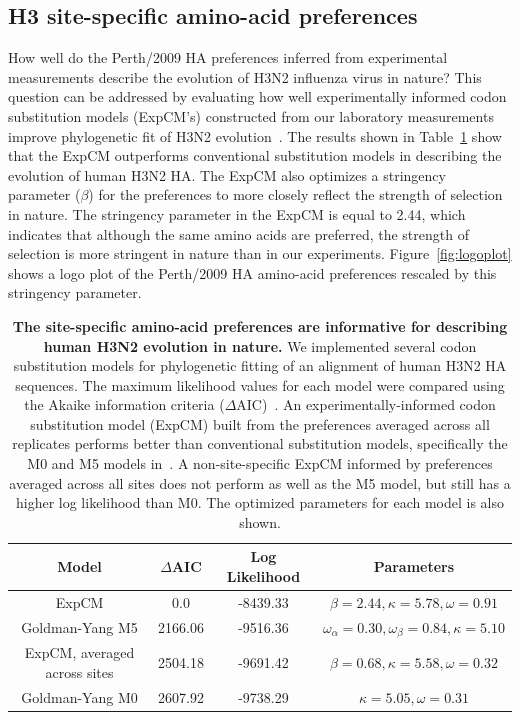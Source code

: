 \documentclass[11pt]{article}
\begin{document}
\subsection*{H3 site-specific amino-acid preferences}
How well do the Perth/2009 HA preferences inferred from experimental measurements describe the evolution of H3N2 influenza virus in nature?
This question can be addressed by evaluating how well experimentally informed codon substitution models (ExpCM's) constructed from our laboratory measurements improve phylogenetic fit of H3N2 evolution~\citep{hilton2017phydms}.
The results shown in Table~\ref{tab:phydms} show that the ExpCM outperforms conventional substitution models in describing the evolution of human H3N2 HA. 
The ExpCM also optimizes a stringency parameter ($\beta$) for the preferences to more closely reflect the strength of selection in nature.
The stringency parameter in the ExpCM is equal to 2.44, which indicates that although the same amino acids are preferred, the strength of selection is more stringent in nature than in our experiments.
Figure~\ref{fig:logoplot} shows a logo plot of the Perth/2009 HA amino-acid preferences rescaled by this stringency parameter.

\begin{table}
\centering
\begin{tabular}{cccc}
\hline
\bf{Model} & \bf{$\Delta$AIC} & \bf{Log Likelihood} & \bf{Parameters} \\ \hline
ExpCM & 0.0 & -8439.33 & $\beta = 2.44, \kappa = 5.78, \omega = 0.91$ \\
Goldman-Yang M5 & 2166.06 & -9516.36 & $\omega_{\alpha} = 0.30, \omega_{\beta} = 0.84, \kappa = 5.10$ \\
ExpCM, averaged across sites & 2504.18 & -9691.42 & $\beta = 0.68, \kappa = 5.58, \omega = 0.32$ \\
Goldman-Yang M0 & 2607.92 & -9738.29 & $\kappa = 5.05, \omega = 0.31$ \\
\hline
\end{tabular}
\caption{\label{tab:phydms}
{\bf The site-specific amino-acid preferences are informative for describing human H3N2 evolution in nature.}
We implemented several codon substitution models for phylogenetic fitting of an alignment of human H3N2 HA sequences. 
The maximum likelihood values for each model were compared using the Akaike information criteria ($\Delta$AIC)~\citep{posada2004model}.
An experimentally-informed codon substitution model (ExpCM) built from the preferences averaged across all replicates performs better than conventional substitution models, specifically the M0 and M5 models in~\cite{yang2000codon}.
A non-site-specific ExpCM informed by preferences averaged across all sites does not perform as well as the M5 model, but still has a higher log likelihood than M0.
The optimized parameters for each model is also shown.
}
\end{table}
\end{document}
